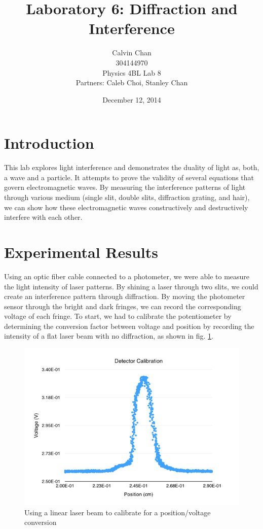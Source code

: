 \documentclass{article}
\begin{document}
\title{Laboratory 6: Diffraction and Interference}
\date{December 12, 2014}
\author{Calvin Chan\\304144970\\Physics 4BL Lab 8\\Partners: Caleb Choi, Stanley
Chan}

\maketitle

\section{Introduction}

This lab explores light interference and demonstrates the duality of light as,
both, a wave and a particle. It attempts to prove the validity of several
equations that govern electromagnetic waves. By measuring the interference
patterns of light through various medium (single slit, double slits, diffraction
grating, and hair), we can show how these electromagnetic waves constructively
and destructively interfere with each other.

\section{Experimental Results}

Using an optic fiber cable connected to a photometer, we were able to measure
the light intensity of laser patterns. By shining a laser through two slits, we
could create an interference pattern through diffraction. By moving the
photometer sensor through the bright and dark fringes, we can record the
corresponding voltage of each fringe. To start, we had to calibrate the
potentiometer by determining the conversion factor between voltage and position
by recording the intensity of a flat laser beam with no diffraction, as shown in
fig. \ref{calibration}.

\begin{figure}[H]
    \centering
    \includegraphics[width=\textwidth]{charts/calibration}
    \caption{Using a linear laser beam to calibrate for a position/voltage
    conversion}
    \label{calibration}
\end{figure}
\end{document}
